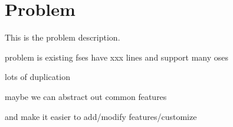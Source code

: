 \section{Problem}
\label{sec:problem}

This is the problem description.

problem is existing fses have xxx lines and support many oses

lots of duplication

maybe we can abstract out common features

and make it easier to add/modify features/customize

